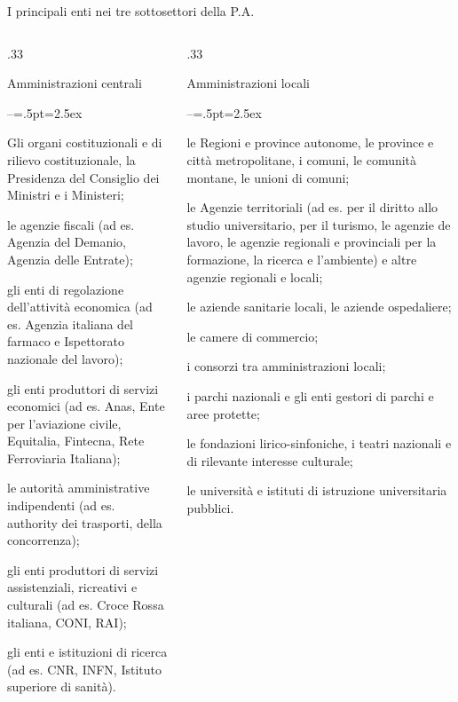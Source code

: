 \documentclass[11pt,italian]{beamer}
\newenvironment{nobulletlist}{\begin{list}{--}{\itemsep=.5pt\itemindent=2.5ex\leftmargin=0pt}}{\end{list}}
\begin{document}
\begin{frame}{I principali enti nei tre sottosettori della P.A.}
\vspace*{-5mm}
\footnotesize
\begin{columns}[t]
\begin{column}{.33\columnwidth}
\begin{block}{\footnotesize Amministrazioni centrali}
\fontsize{8}{7,5}\selectfont
\begin{nobulletlist}
\item Gli organi costituzionali e di rilievo costituzionale, la Presidenza del Consiglio dei Ministri e i Ministeri;
\item le agenzie fiscali (ad es. Agenzia del Demanio, Agenzia delle Entrate);
\item gli enti di regolazione dell’attività economica (ad es. Agenzia italiana del farmaco e Ispettorato nazionale del lavoro);
\item gli enti produttori di servizi economici (ad es. Anas, Ente per l’aviazione civile, Equitalia, Fintecna, Rete Ferroviaria Italiana);
\item le autorità amministrative indipendenti (ad es. authority dei trasporti, della concorrenza);
\item gli enti produttori di servizi assistenziali, ricreativi e culturali (ad es. Croce Rossa italiana, CONI, RAI);
\item gli enti e istituzioni di ricerca (ad es. CNR, INFN, Istituto superiore di sanità).
\end{nobulletlist}
\end{block}
\end{column}

\begin{column}{.33\columnwidth}
\begin{block}{\footnotesize Amministrazioni locali}
\fontsize{8}{7.5}\selectfont
\begin{nobulletlist}
\item le Regioni e province autonome, le province e città metropolitane, i comuni, le comunità montane, le unioni di comuni;
\item le Agenzie territoriali (ad es. per il diritto allo studio universitario, per il turismo, le agenzie de lavoro, le agenzie regionali e provinciali per la formazione, la ricerca e l’ambiente) e altre agenzie regionali e locali;
\item le aziende sanitarie locali, le aziende ospedaliere;
\item le camere di commercio;
\item i consorzi tra amministrazioni locali;
\item i parchi nazionali e gli enti gestori di parchi e aree protette;
\item le fondazioni lirico-sinfoniche, i teatri nazionali e di rilevante interesse culturale;
\item le università e istituti di istruzione universitaria pubblici.
\end{nobulletlist}
\end{block}
\end{column}


\end{columns}
\end{frame}
\end{document}
